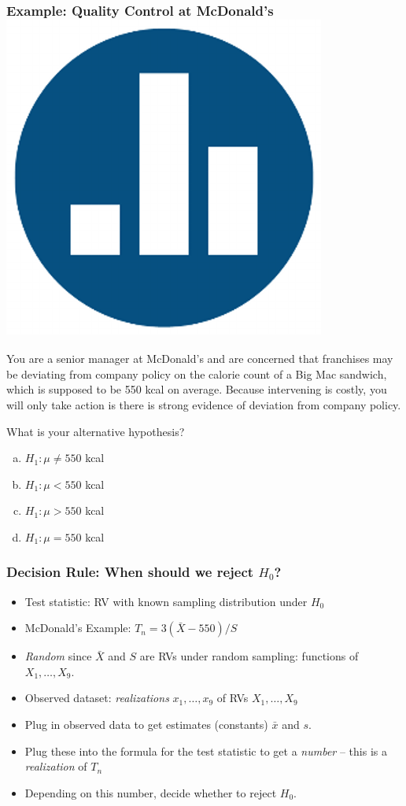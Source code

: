 \documentclass[handout]{beamer}
\begin{document}
\begin{frame}
\frametitle{Example: Quality Control at McDonald's \hfill \includegraphics[scale = 0.05]{./images/clicker}}

You are a senior manager at McDonald's and are concerned that franchises may be deviating from company policy on the calorie count of a Big Mac sandwich, which is supposed to be 550 kcal on average. Because intervening is costly, you will only take action is there is strong evidence of deviation from company policy. \\

\vspace{1em}

\alert{What is your alternative hypothesis?}
	\begin{enumerate}[(a)]
		\item $H_1\colon \mu \neq 550$ kcal
		\item $H_1\colon \mu < 550$ kcal
		\item $H_1\colon \mu > 550$ kcal
		\item $H_1\colon \mu = 550$ kcal
\end{enumerate}
\end{frame}
\begin{frame}
	\frametitle{Decision Rule: When should we reject $H_0$?}
	\begin{itemize}
		\item Test statistic: RV with known sampling distribution under $H_0$
		\item McDonald's Example: $T_n = 3(\bar{X} - 550)/S$
		\item \emph{Random} since $\bar{X}$ and $S$ are RVs under random sampling: functions of $X_1, \hdots, X_9$.
		\item Observed dataset: \emph{realizations} $x_1, \hdots, x_9$ of RVs $X_1, \hdots, X_9$
		\item Plug in observed data to get estimates (constants) $\bar{x}$ and $s$.
		\item Plug these into the formula for the test statistic to get a \emph{number} -- this is a \emph{realization} of $T_n$ 
		\item Depending on this number, decide whether to reject $H_0$.
	\end{itemize}
\end{frame}
\end{document}
